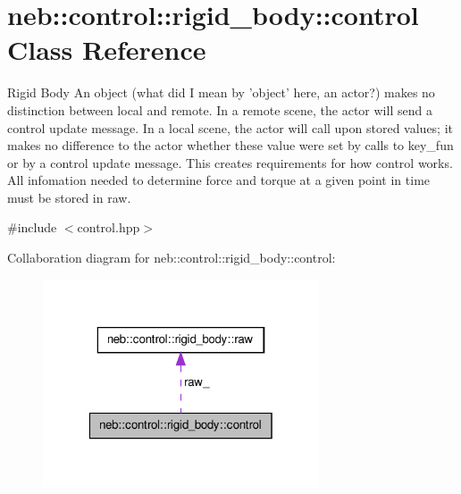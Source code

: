 \hypertarget{classneb_1_1control_1_1rigid__body_1_1control}{\section{neb\-:\-:control\-:\-:rigid\-\_\-body\-:\-:control \-Class \-Reference}
\label{classneb_1_1control_1_1rigid__body_1_1control}
}


\-Rigid \-Body \-An object (what did \-I mean by 'object' here, an actor?) makes no distinction between local and remote. \-In a remote scene, the actor will send a control update message. \-In a local scene, the actor will call upon stored values; it makes no difference to the actor whether these value were set by calls to key\-\_\-fun or by a control update message. \-This creates requirements for how control works. \-All infomation needed to determine force and torque at a given point in time must be stored in raw.  




{\ttfamily \#include $<$control.\-hpp$>$}



\-Collaboration diagram for neb\-:\-:control\-:\-:rigid\-\_\-body\-:\-:control\-:\nopagebreak
\begin{figure}[H]
\begin{center}
\leavevmode
\includegraphics[width=232pt]{classneb_1_1control_1_1rigid__body_1_1control__coll__graph}
\end{center}
\end{figure}
